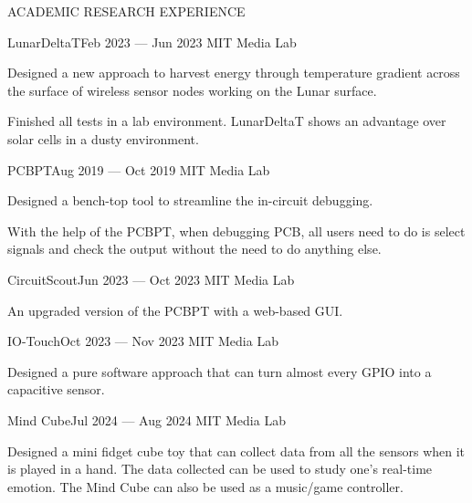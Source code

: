 \documentclass{resume} %
\begin{document}
\begin{rSection}{ACADEMIC RESEARCH EXPERIENCE}
\begin{rSubsection}{LunarDeltaT}{Feb 2023 --- Jun 2023}{ }{MIT Media Lab}
\item Designed a new approach to harvest energy through temperature gradient across
      the surface of wireless sensor nodes working on the Lunar surface.
\item Finished all tests in a lab environment.
      LunarDeltaT shows an advantage over solar cells in a dusty environment.
\end{rSubsection}

\begin{rSubsection}{PCBPT}{Aug 2019 --- Oct 2019}{ }{MIT Media Lab}
\item Designed a bench-top tool to streamline the in-circuit debugging.
\item With the help of the PCBPT, when debugging PCB, all users need to do is select signals and check the output without the need to do anything else.
\end{rSubsection}

\begin{rSubsection}{CircuitScout}{Jun 2023 --- Oct 2023}{ }{MIT Media Lab}
\item An upgraded version of the PCBPT with a web-based GUI.
\end{rSubsection}

\begin{rSubsection}{IO-Touch}{Oct 2023 --- Nov 2023}{ }{MIT Media Lab}
\item Designed a pure software approach that can turn almost every GPIO into a capacitive sensor.
\end{rSubsection}

\begin{rSubsection}{Mind Cube}{Jul 2024 --- Aug 2024}{ }{MIT Media Lab}
\item Designed a mini fidget cube toy that can collect data from all the sensors when it is
played in a hand. The data collected can be used to study one's real-time emotion.
The Mind Cube can also be used as a music/game controller.
\end{rSubsection}

\end{rSection}
\end{document}
